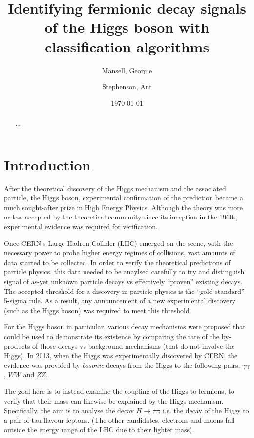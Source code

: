 

\usepackage[toc,page]{appendix}
\usepackage{fancyhdr}
\usepackage{enumitem}
\usepackage{pifont}

\pagestyle{fancy}
\rhead{}
\lhead{}

\author{Mansell, Georgie \and Stephenson, Ant}
\date{\today}
\title{Identifying fermionic decay signals of the Higgs boson with classification algorithms}


\maketitle
\begin{abstract}
    ...
\end{abstract}

\section{Introduction}
After the theoretical discovery of the Higgs mechanism and the associated particle, the Higgs boson, experimental confirmation of the prediction became a much sought-after prize in High Energy Physics. Although the theory was more or less accepted by the theoretical community since its inception in the 1960s, experimental evidence was required for verification. 

Once CERN's Large Hadron Collider (LHC) emerged on the scene, with the necessary power to probe higher energy regimes of collisions, vast amounts of data started to be collected. In order to verify the theoretical predictions of particle physics, this data needed to be anaylsed carefully to try and distinguish signal of as-yet unknown particle decays vs effectively ``proven'' existing decays. The accepted threshold for a discovery in particle physics is the ``gold-standard'' 5-sigma rule. As a result, any announcement of a new experimental discovery (such as the Higgs boson) was required to meet this threshold. 

For the Higgs boson in particular, various decay mechanisms were proposed that could be used to demonstrate its existence by comparing the rate of the by-products of those decays vs background mechanisms (that do not involve the Higgs). In 2013, when the Higgs was experimentally discovered by CERN, the evidence was provided by \emph{bosonic} decays from the Higgs to the following pairs, $\gamma\gamma$, $WW$ and $ZZ$. 

The goal here is to instead examine the coupling of the Higgs to fermions, to verify that their mass can likewise be explained by the Higgs mechanism. Specifically, the aim is to analyse the decay $H\rightarrow\tau\tau$; i.e. the decay of the Higgs to a pair of tau-flavour leptons. (The other candidates, electrons and muons fall outside the energy range of the LHC due to their lighter mass).

